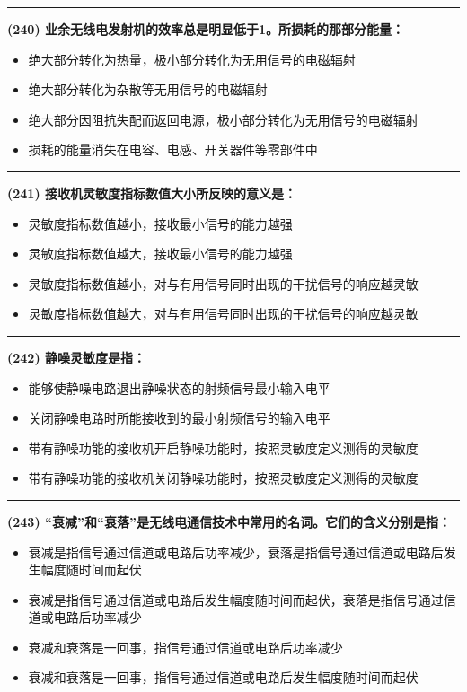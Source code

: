 \documentclass[twocolumn]{ctexart}  %
\begin{document}
\noindent\rule{0.5\textwidth}{1pt}
\heiti \textbf{(240) 业余无线电发射机的效率总是明显低于1。所损耗的那部分能量：} \songti {\color{gray} [LK0814] }
\begin{itemize}
	\item  绝大部分转化为热量，极小部分转化为无用信号的电磁辐射
	\item  绝大部分转化为杂散等无用信号的电磁辐射
	\item  绝大部分因阻抗失配而返回电源，极小部分转化为无用信号的电磁辐射
	\item  损耗的能量消失在电容、电感、开关器件等零部件中
\end{itemize}


\noindent\rule{0.5\textwidth}{1pt}
\heiti \textbf{(241) 接收机灵敏度指标数值大小所反映的意义是：} \songti {\color{gray} [LK0816] }
\begin{itemize}
	\item  灵敏度指标数值越小，接收最小信号的能力越强
	\item  灵敏度指标数值越大，接收最小信号的能力越强
	\item  灵敏度指标数值越小，对与有用信号同时出现的干扰信号的响应越灵敏
	\item  灵敏度指标数值越大，对与有用信号同时出现的干扰信号的响应越灵敏
\end{itemize}


\noindent\rule{0.5\textwidth}{1pt}
\heiti \textbf{(242) 静噪灵敏度是指：} \songti {\color{gray} [LK0819] }
\begin{itemize}
	\item  能够使静噪电路退出静噪状态的射频信号最小输入电平
	\item  关闭静噪电路时所能接收到的最小射频信号的输入电平
	\item  带有静噪功能的接收机开启静噪功能时，按照灵敏度定义测得的灵敏度
	\item  带有静噪功能的接收机关闭静噪功能时，按照灵敏度定义测得的灵敏度
\end{itemize}


\noindent\rule{0.5\textwidth}{1pt}
\heiti \textbf{(243) “衰减”和“衰落”是无线电通信技术中常用的名词。它们的含义分别是指：} \songti {\color{gray} [LK0854] }
\begin{itemize}
	\item  衰减是指信号通过信道或电路后功率减少，衰落是指信号通过信道或电路后发生幅度随时间而起伏
	\item  衰减是指信号通过信道或电路后发生幅度随时间而起伏，衰落是指信号通过信道或电路后功率减少
	\item  衰减和衰落是一回事，指信号通过信道或电路后功率减少
	\item  衰减和衰落是一回事，指信号通过信道或电路后发生幅度随时间而起伏
\end{itemize}
\end{document}
